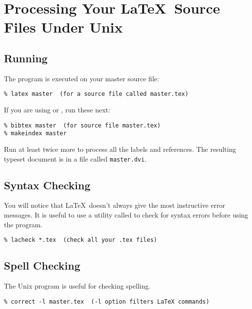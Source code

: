 \chapter{Processing Your \LaTeX\ Source Files Under Unix}
\section{Running }
The  program is executed on your master source file:
\begin{verbatim}
% latex master  (for a source file called master.tex)
\end{verbatim}
If you are using  or , run these next:
\begin{verbatim}
% bibtex master  (for source file master.tex)
% makeindex master
\end{verbatim}
Run  at least twice more to process all the labels and references.
The resulting typeset document is in a file called \verb=master.dvi=.
\section{Syntax Checking}
You will notice that \LaTeX\ doesn't always give the most instructive error messages.
It is useful to use a utility called  to check for syntax errors before using the  program.
\begin{verbatim}
% lacheck *.tex  (check all your .tex files)
\end{verbatim}
\section{Spell Checking}
The Unix  program is useful for checking spelling.
\begin{verbatim}
% correct -l master.tex  (-l option filters LaTeX commands)
\end{verbatim}
